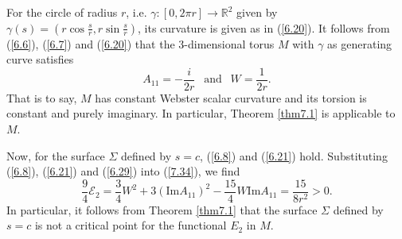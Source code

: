 \documentclass{amsart}
\theoremstyle{Corollary}
\numberwithin{equation}{section}
\begin{document}
For the circle of radius $r$, i.e. $\gamma: [0,2\pi r]\to\mathbb{R}^2$ given by 
$\gamma(s)=(r\cos\frac{s}{r},r\sin \frac{s}{r})$, 
its curvature is given as in (\ref{6.20}). 
It follows from (\ref{6.6}), (\ref{6.7}) and  (\ref{6.20}) that the $3$-dimensional torus $M$ 
with $\gamma$ as generating curve 
satisfies 
\begin{equation}\label{6.29}
A_{11}=-\frac{i}{2r}~~\mbox{ and }~~W=\frac{1}{2r}.
\end{equation}
That is to say, $M$ has constant Webster scalar curvature and 
its torsion is constant and purely imaginary.
In particular, Theorem \ref{thm7.1} is applicable to $M$. 

Now, for the surface $\Sigma$ defined by $s=c$, 
(\ref{6.8}) and (\ref{6.21}) hold. 
Substituting (\ref{6.8}), (\ref{6.21}) and (\ref{6.29}) into 
 (\ref{7.34}), we find 
\begin{equation*}
\frac{9}{4}\mathcal{E}_2=\frac{3}{4}W^2
+3(\mbox{Im}A_{11})^2-\frac{15}{4}W\mbox{Im}A_{11}=\frac{15}{8r^2}>0. 
\end{equation*}
 In particular, it follows from Theorem \ref{thm7.1} that
  the surface $\Sigma$ defined by $s=c$
 is not a critical point 
for the functional $E_2$ in $M$. 
\end{document}
